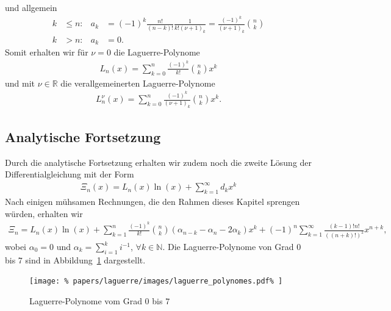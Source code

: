 und allgemein
\begin{align*}
k
  & \leq
n:
  &
a_k
  & =
(-1)^k \frac{n!}{(n-k)!} \frac{1}{k!(\nu + 1)_k}
=
\frac{(-1)^k}{(\nu + 1)_k} \binom{n}{k}
\\
k & >n:
  &
a_k
  & =
0.
\end{align*}
Somit erhalten wir für $\nu = 0$ die Laguerre-Polynome
\begin{align}
L_n(x)
=
\sum_{k=0}^{n} \frac{(-1)^k}{k!} \binom{n}{k} x^k
\label{laguerre:polynom}
\end{align}
und mit $\nu \in \mathbb{R}$ die verallgemeinerten Laguerre-Polynome
\begin{align}
L_n^\nu(x)
=
\sum_{k=0}^{n} \frac{(-1)^k}{(\nu + 1)_k} \binom{n}{k} x^k.
\label{laguerre:allg_polynom}
\end{align}

\subsection{Analytische Fortsetzung}
Durch die analytische Fortsetzung erhalten wir zudem noch die zweite Lösung der
Differentialgleichung mit der Form
\begin{align*}
\Xi_n(x)
=
L_n(x) \ln(x) + \sum_{k=1}^\infty d_k x^k
\end{align*}
Nach einigen mühsamen Rechnungen,
die den Rahmen dieses Kapitel sprengen würden,
erhalten wir
\begin{align*}
\Xi_n
=
L_n(x) \ln(x)
+
\sum_{k=1}^n \frac{(-1)^k}{k!} \binom{n}{k}
(\alpha_{n-k} - \alpha_n - 2 \alpha_k)x^k
+
(-1)^n \sum_{k=1}^\infty \frac{(k-1)!n!}{((n+k)!)^2} x^{n+k},
\end{align*}
wobei $\alpha_0 = 0$ und $\alpha_k =\sum_{i=1}^k i^{-1}$,
$\forall k \in \mathbb{N}$.
Die Laguerre-Polynome von Grad $0$ bis $7$ sind in
Abbildung~\ref{laguerre:fig:polyeval} dargestellt.
\begin{figure}
\centering
\texttt{[image: \%
    papers/laguerre/images/laguerre\_polynomes.pdf\%
]}
\caption{Laguerre-Polynome vom Grad $0$ bis $7$}
\label{laguerre:fig:polyeval}
\end{figure}

